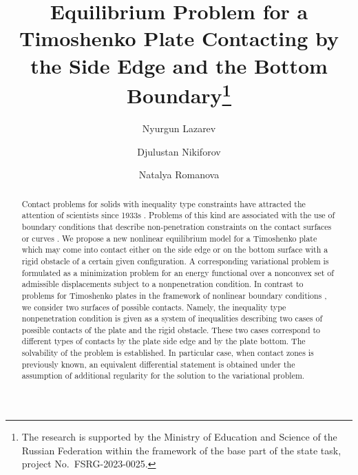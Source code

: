 \documentclass[12pt]{llncs}
\begin{document}
\fi
%
\title{Equilibrium Problem for a Timoshenko Plate Contacting by the Side Edge and the Bottom Boundary\thanks{The research is
supported by the Ministry of Education and Science of the Russian
Federation within the framework of the base part of the state
task, project No.~FSRG-2023-0025.}}
\author{Nyurgun Lazarev   \and  Djulustan Nikiforov  \and  Natalya Romanova
}

\maketitle

\begin{abstract}
Contact problems for solids with inequality type constraints have
attracted the attention of scientists since 1933s
\cite{Sign,KhludnevKovtunenko}. Problems of this kind are
associated with the use of boundary conditions that describe
non-penetration constraints on the contact surfaces or curves
\cite{KhludnevKovtunenko,RudoyESIAM}. We propose a new nonlinear
equilibrium model for a Timoshenko plate which may come into
contact either on the side edge or on the bottom surface with a
rigid obstacle of a certain given configuration. A corresponding
variational problem is formulated as a minimization problem for an
energy functional over a nonconvex set of admissible displacements
subject to a nonpenetration condition. In contrast to problems for
Timoshenko plates in the framework of nonlinear boundary
conditions \cite{laz1,laz2}, we consider two surfaces of possible
contacts. Namely, the inequality type nonpenetration condition is
given as a system of inequalities describing two cases of possible
contacts of the plate and the rigid obstacle. These two cases
correspond to different types of contacts by the plate side edge
and by the plate bottom. The solvability of the problem is
established. In particular case, when contact zones is previously
known, an equivalent differential statement is obtained under the
assumption of additional regularity for the solution to the
variational problem.

\end{abstract}
\end{document}
